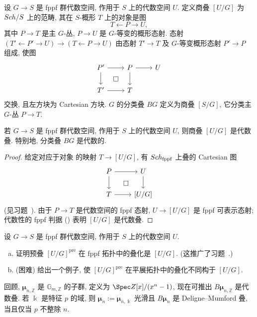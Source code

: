 \begin{definition}[商叠与分类叠]\label{src:7.3.8}
设 $G\to S$ 是 fppf 群代数空间, 作用于 $S$ 上的代数空间 $U$. 定义商叠 $[U/G]$ 为 $Sch/S$ 上的范畴, 其在 $S$-概形 $T$ 上的对象是图
\begin{equation}\label{src:7.3.9}
T\longleftarrow P\longrightarrow U,
\end{equation}
其中 $P\to T$ 是主 $G$-丛, $P\to U$ 是 $G$-等变的概形态射. 态射 $(T'\leftarrow P'\to U)\to(T\leftarrow P\to U)$ 由态射 $T'\to T$ 及 $G$-等变概形态射 $P'\to P$ 组成, 使图
\[
\begin{tikzcd}[ampersand replacement=\&]
P'\arrow[r]\arrow[d]\&P\arrow[r]\arrow[d]\&U\\
T'\arrow[r]\arrow[ur,phantom,"{\square}"]\&T\&
\end{tikzcd}
\]
交换, 且左方块为 Cartesian 方块.
$G$ 的分类叠 $BG$ 定义为商叠 $[S/G]$, 它分类主 $G$-丛 $P\to T$.
\end{definition}
\begin{proposition}\label{src:7.3.10}
若 $G\to S$ 是 fppf 群代数空间, 作用于 $S$ 上的代数空间 $U$, 则商叠 $[U/G]$ 是代数叠. 特别地, 分类叠 $BG$ 是代数的.
\end{proposition}
\begin{proof}
给定对应于对象  的映射 $T\to[U/G]$, 有 $Sch_{\mathrm{fppf}}$ 上叠的 Cartesian 图
\[
\begin{tikzcd}[ampersand replacement=\&]
P\arrow[r]\arrow[d]\&U\arrow[d]\\
T\arrow[r]\arrow[ur,phantom,"{\square}"]\&{[U/G]}
\end{tikzcd}
\]
(见习题~). 由于 $P\to T$ 是代数空间的 fppf 态射, $U\to[U/G]$ 是 fppf 可表示态射; 代数性的 fppf 判据 () 表明 $[U/G]$ 是代数叠.
\end{proof}
\begin{exercise}\label{src:7.3.11}
设 $G\to S$ 是 fppf 群代数空间, 作用于 $S$ 上的代数空间 $U$.
\begin{enumerate}[(a)]
\item 证明预叠 $[U/G]^{\mathrm{pre}}$ 在 fppf 拓扑中的叠化是 $[U/G]$. (这推广了习题~.)
\item (困难) 给出一个例子, 使 $[U/G]^{\mathrm{pre}}$ 在平展拓扑中的叠化不同构于 $[U/G]$.
\end{enumerate}
\end{exercise}
回顾, $\boldsymbol\mu_{n,\mathbb Z}$ 是 $\mathbb G_{m,\mathbb Z}$ 的子群, 定义为 $\Spec\mathbb Z[x]/(x^n-1)$, 现在可推出 $B\boldsymbol\mu_{n,\mathbb Z}$ 是代数叠. 若 $\Bbbk$ 是特征 $p$ 的域, 则 $\boldsymbol\mu_n:=\boldsymbol\mu_{n,\Bbbk}$ 光滑且 $B\boldsymbol\mu_n$ 是 Deligne--Mumford 叠, 当且仅当 $p$ 不整除 $n$.
